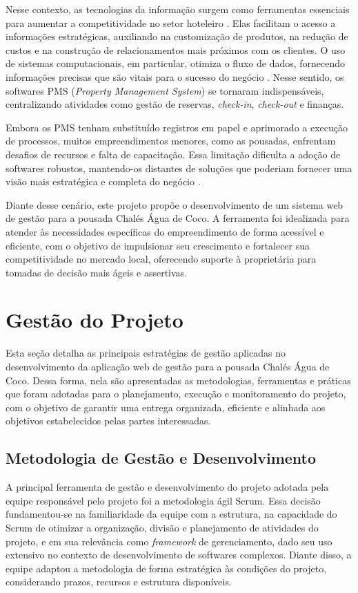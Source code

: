 \documentclass[
	12pt,				%
	openany,			%
	oneside,			%
	a4paper,			%
	english,			%
	french,				%
	spanish,			%
	brazil				%
	]{abntex2}
\begin{document}
Nesse contexto, as tecnologias da informação surgem como ferramentas essenciais para aumentar a competitividade no setor hoteleiro \cite{buhalis1998}. Elas facilitam o acesso a informações estratégicas, auxiliando na customização de produtos, na redução de custos e na construção de relacionamentos mais próximos com os clientes. O uso de sistemas computacionais, em particular, otimiza o fluxo de dados, fornecendo informações precisas que são vitais para o sucesso do negócio \cite{zeferino2012}. Nesse sentido, os softwares PMS (\textit{Property Management System}) se tornaram indispensáveis, centralizando atividades como gestão de reservas, \textit{check-in}, \textit{check-out} e finanças.

Embora os PMS tenham substituído registros em papel e aprimorado a execução de processos, muitos empreendimentos menores, como as pousadas, enfrentam desafios de recursos e falta de capacitação. Essa limitação dificulta a adoção de softwares robustos, mantendo-os distantes de soluções que poderiam fornecer uma visão mais estratégica e completa do negócio \cite{lunardi2010}.

Diante desse cenário, este projeto propõe o desenvolvimento de um sistema web de gestão para a pousada Chalés Água de Coco. A ferramenta foi idealizada para atender às necessidades específicas do empreendimento de forma acessível e eficiente, com o objetivo de impulsionar seu crescimento e fortalecer sua competitividade no mercado local, oferecendo suporte à proprietária para tomadas de decisão mais ágeis e assertivas.
%
\chapter{Gestão do Projeto}
Esta seção detalha as principais estratégias de gestão aplicadas no desenvolvimento da aplicação web de gestão para a pousada Chalés Água de Coco. Dessa forma, nela são apresentadas as metodologias, ferramentas e práticas que foram adotadas para o planejamento, execução e monitoramento do projeto, com o objetivo de garantir uma entrega organizada, eficiente e alinhada aos objetivos estabelecidos pelas partes interessadas.
% 
\section{Metodologia de Gestão e Desenvolvimento}
A principal ferramenta de gestão e desenvolvimento do projeto adotada pela equipe responsável pelo projeto foi a metodologia ágil Scrum. Essa decisão fundamentou-se na familiaridade da equipe com a estrutura, na capacidade do Scrum de otimizar a organização, divisão e planejamento de atividades do projeto, e em sua relevância como \textit{framework} de gerenciamento, dado seu uso extensivo no contexto de desenvolvimento de softwares complexos. Diante disso, a equipe adaptou a metodologia de forma estratégica às condições do projeto, considerando prazos, recursos e estrutura disponíveis.
\end{document}
